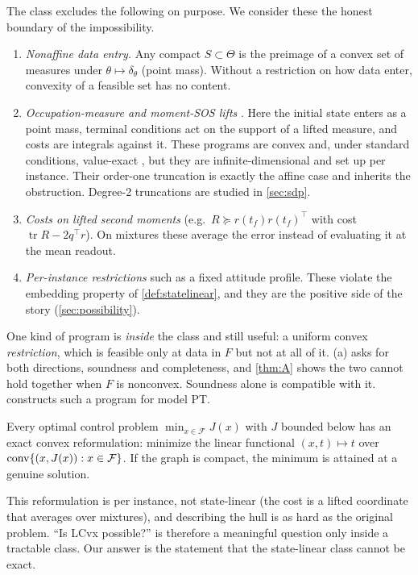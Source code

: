 The class excludes the following on purpose. We consider these the honest boundary of the impossibility.
\begin{enumerate}[leftmargin=*,itemsep=2pt]
\item \emph{Nonaffine data entry.} Any compact $S\subset\Theta$ is the preimage of a convex set of measures under
$\theta\mapsto\delta_\theta$ (point mass). Without a restriction on how data enter, convexity of a feasible set has no
content.
\item \emph{Occupation-measure and moment-SOS lifts} \cite{lasserre2008sicon,henrionkorda2014tac}. Here the initial
state enters as a point mass, terminal conditions act on the support of a lifted measure, and costs are integrals
against it. These programs are convex and, under standard conditions, value-exact \cite{vinter2000book,palladino2014sicon},
but they are infinite-dimensional and set up per instance. Their order-one truncation is exactly the affine case and
inherits the obstruction. Degree-2 truncations are studied in \cref{sec:sdp}.
\item \emph{Costs on lifted second moments} (e.g.\ $R\succeq r(t_f)r(t_f)^\top$ with cost $\operatorname{tr}R-2q^\top r$). On
mixtures these average the error instead of evaluating it at the mean readout.
\item \emph{Per-instance restrictions} such as a fixed attitude profile. These violate the embedding property of
\cref{def:statelinear}, and they are the positive side of the story (\cref{sec:possibility}).
\end{enumerate}
One kind of program is \emph{inside} the class and still useful: a uniform convex \emph{restriction}, which is feasible only at data
in $F$ but not at all of it. (a) asks for both directions, soundness and completeness, and \cref{thm:A} shows the
two cannot hold together when $F$ is nonconvex. Soundness alone is compatible with it.  constructs such a program for
model PT.

\begin{proposition}\label{prop:triv}
Every optimal control problem $\min_{x\in\mathcal F}J(x)$ with $J$ bounded below has an exact convex reformulation:
minimize the linear functional $(x,t)\mapsto t$ over $\operatorname{conv}\{(x,J(x)):x\in\mathcal F\}$. If the graph is compact,
the minimum is attained at a genuine solution.\Spending
\end{proposition}
This reformulation is per instance, not state-linear (the cost is a lifted coordinate that averages over mixtures),
and describing the hull is as hard as the original problem. ``Is LCvx possible?'' is therefore a meaningful question
only inside a tractable class. Our answer is the statement that the state-linear class cannot be exact.
